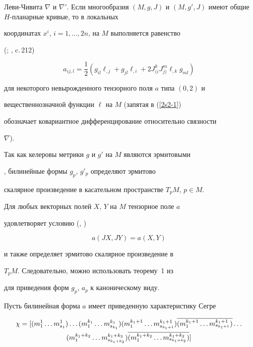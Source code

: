Леви-Чивита $\nabla$ и $\nabla'$. Если многообразия $(M,g,J)$ и $(M,


g',J)$ имеют общие $H$-планарные кривые, то в локальных


координатах $x^i$, $i=1,\dotsc,2n$, на $M$ выполняется равенство


(\cite{domik}; \cite{sin1}, c.\,212)


\begin{equation}\label{2s2-1}


a_{ij,l}=\frac{1}{2}(g_{il}\ell_{,j} + g_{jl}\ell_{,i} +2J^k_{(i}


J^m_{j)} \ell_{,k}g_{ml})


\end{equation}


для некоторого невырожденного тензорного поля $a$ типа $(0,2)$ и


вещественнозначной функции $\ell$ на $M$ (запятая в (\ref{2s2-1})


обозначает ковариантное дифференцирование относительно связности


$\nabla$).





Так как келеровы метрики $g$ и $g'$ на $M$ являются эрмитовыми


\cite{kobn}, билинейные формы $g_p$, $g'_p$ определяют эрмитово


скалярное произведение в касательном пространстве $T_pM$, $p\in M$.


Для любых векторных полей $X$, $Y$ на $M$ тензорное поле $a$


удовлетворяет условию (\cite{domik}, \cite{sin1})


\begin{equation}\label{2s2-1bis}


a(JX,JY) = a(X,Y)


\end{equation}


и также определяет эрмитово скалярное произведение в


$T_p M$. Следовательно, можно использовать теорему~1 из


\cite{kanew} для приведения форм $g_p$, $a_p$ к каноническому виду.





Пусть билинейная форма $a$ имеет приведенную характеристику Сегре


\cite{kanew}


\begin{multline}\label{2s1-9star}


\chi=[(m^1_1\dotsc m^1_{s_1})\dotsc(m^{k_1}_1\dotsc m^{k_1}_{s_{k_1}})


(m^{k_1+1}_1 \dotsc m^{k_1+1}_{s_{k_1+1}})


\ol{(m^{k_1+1}_1 \dotsc m^{k_1+1}_{s_{k_1+1}})} \dotsc \\


%


(m^{k_1+k_2}_1 \dotsc m^{k_1+k_2}_{s_{k_1+k_2}})


\ol{(m^{k_1+k_2}_1 \dotsc m^{k_1+k_2}_{s_{k_1+k_2}})}]


\end{multline}


